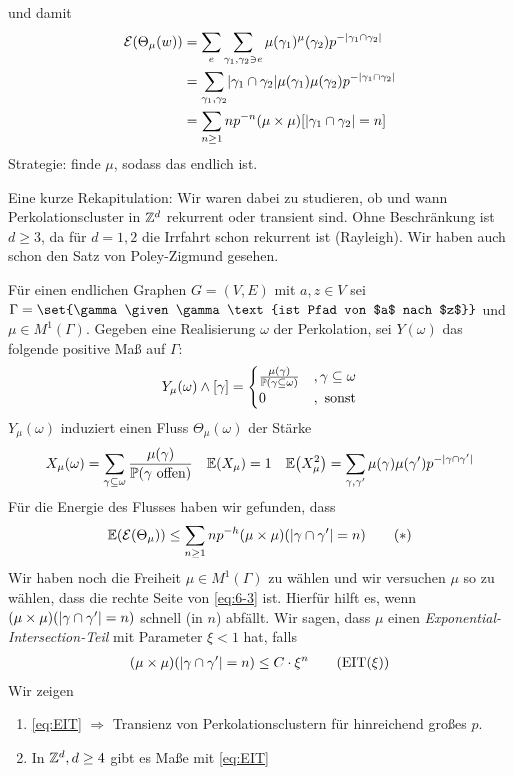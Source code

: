 und damit 
\begin{align}
	\mathcal{E}(\Theta_{\mu}(w)) &= \sum\limits_{e} \sum\limits_{\gamma_1,\gamma_2 \ni e} \mu(\gamma_1)^\mu(\gamma_2) p^{-\abs{\gamma_1 \cap \gamma_2}} \\
		&= \sum\limits_{\gamma_1,\gamma_2}\abs{\gamma_1 \cap \gamma_2} \mu(\gamma_1) \mu(\gamma_2) p^{-\abs{\gamma_1 \cap \gamma_2}} \\
		&= \sum\limits_{n \geq 1} np^{-n} (\mu \times \mu) \benb{\abs{\gamma_1 \cap \gamma_2} = n}
\end{align}
Strategie: finde $\mu$, sodass das endlich ist. 
		
Eine kurze Rekapitulation: Wir waren dabei zu studieren, ob und wann Perkolationscluster in $\mathbb{Z}^d$ rekurrent oder transient sind. Ohne Beschränkung ist $d \geq 3$, da für $d=1,2$ die Irrfahrt schon rekurrent ist (Rayleigh). Wir haben auch schon den Satz von Poley-Zigmund gesehen.

Für einen endlichen Graphen $G = (V,E)$ mit $a,z \in V$ sei $\Gamma = \set{\gamma\given \gamma \text{ist Pfad von $a$ nach $z$}}$ und $\mu \in M^1(\Gamma)$. Gegeben eine Realisierung $\omega$ der Perkolation, sei $Y(\omega)$ das folgende positive Maß auf $\Gamma$:
\begin{align} 
	Y_{\mu} (\omega) \land \benb{\gamma} = \begin{cases}
	\frac{\mu(\gamma)}{\prop{\gamma \subseteq \omega}} & , \gamma \subseteq \omega \\
	0 & , \text{ sonst}
	\end{cases}
\end{align}
$Y_{\mu}(\omega)$ induziert einen Fluss $\Theta_{\mu}(\omega)$ der Stärke 
\begin{align}
	X_{\mu}(\omega) = \sum\limits_{\gamma \subseteq \omega} \frac{\mu(\gamma)}{\prop{\gamma \text{ offen}}} && \EW{X_{\mu}} = 1 && \EW{X_{\mu}^2} = \sum\limits_{\gamma, \gamma'} \mu(\gamma) \mu(\gamma') p^{-\abs{\gamma \cap \gamma'}} 
\end{align}
Für die Energie des Flusses haben wir gefunden, dass 
\begin{align*}
	\EW{\mathcal{E}(\Theta_{\mu})} \leq \sum\limits_{n \geq 1} n p^{-h} \enb{\mu \times \mu}(\abs{\gamma \cap \gamma'} = n) \tag{$*$} \label{eq:6-3}
\end{align*}
Wir haben noch die Freiheit $\mu \in M^1(\Gamma)$ zu wählen und wir versuchen $\mu$ so zu wählen, dass die rechte Seite von \eqref{eq:6-3} ist. Hierfür hilft es, wenn $(\mu \times \mu)(\lvert\gamma \cap \gamma'\rvert = n)$ schnell (in $n$) abfällt. Wir sagen, dass $\mu$ einen \emph{Exponential-Intersection-Teil} mit Parameter $\xi < 1$ hat, falls
\begin{align}
	\enb{\mu \times \mu}\enb{\abs{\gamma \cap \gamma'} = n} \leq C \cdot \xi^n \tag{EIT($\xi$)}\label{eq:EIT}
\end{align} 
Wir zeigen 
\begin{enumerate}
	\item \ref{eq:EIT} $\Rightarrow$ Transienz von Perkolationsclustern für hinreichend großes $p$.
	\item In $\mathbb{Z}^d, d \geq 4$ gibt es Maße mit \ref{eq:EIT}
\end{enumerate}

